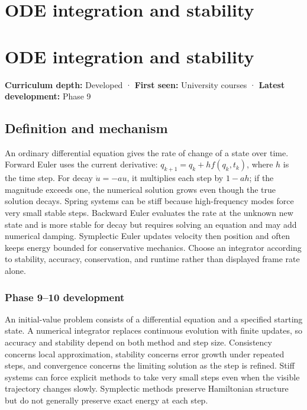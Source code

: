 \hypertarget{appendix-18eacf61a04b}{}
\section*{ODE integration and stability}
\section{ODE integration and stability}\label{appendix-18eacf61a04b-ode-integration-and-stability}

\textbf{Curriculum depth:} Developed · \textbf{First seen:} University courses · \textbf{Latest development:} Phase 9

\subsection{Definition and mechanism}\label{appendix-18eacf61a04b-definition-and-mechanism}

An ordinary differential equation gives the rate of change of a state over time. Forward Euler uses the current derivative: \(q_{k+1}=q_k+h f(q_k,t_k)\), where \(h\) is the time step. For decay \(\dot u=-au\), it multiplies each step by \(1-ah\); if the magnitude exceeds one, the numerical solution grows even though the true solution decays. Spring systems can be stiff because high-frequency modes force very small stable steps. Backward Euler evaluates the rate at the unknown new state and is more stable for decay but requires solving an equation and may add numerical damping. Symplectic Euler updates velocity then position and often keeps energy bounded for conservative mechanics. Choose an integrator according to stability, accuracy, conservation, and runtime rather than displayed frame rate alone.

\subsubsection{Phase 9--10 development}\label{appendix-18eacf61a04b-phase-910-development}

An initial-value problem consists of a differential equation and a specified starting state. A numerical integrator replaces continuous evolution with finite updates, so accuracy and stability depend on both method and step size. Consistency concerns local approximation, stability concerns error growth under repeated steps, and convergence concerns the limiting solution as the step is refined. Stiff systems can force explicit methods to take very small steps even when the visible trajectory changes slowly. Symplectic methods preserve Hamiltonian structure but do not generally preserve exact energy at each step.

